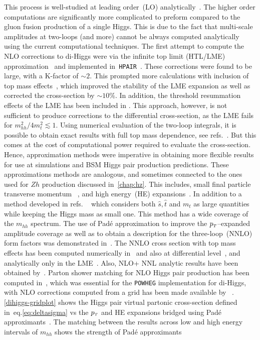 This process is well-studied at leading order~(LO) analytically~\cite{EBOLI1987269,GLOVER1988282,DICUS1988457,Plehn:1996wb}.  The higher order computations are significantly more complicated to preform compared to the gluon fusion production of a single Higgs. This is due to the fact that multi-scale amplitudes at two-loops (and more) cannot be always computed analytically using the current computational techniques.  The first attempt to compute the NLO corrections to di-Higgs were via the infinite top limit (HTL/LME)  approximation~\cite{Dawson:1998py, Altenkamp:2012sx,Grigo:2014jma} and implemented in~\texttt{HPAIR}~\cite{Plehn:1996wb}. These corrections were found to be large, with a K-factor of $ \sim 2$.  This prompted more calculations with inclusion of top mass effects~\cite{deFlorian:2013uza,Grigo:2013rya,Maltoni:2014eza,Grigo:2015dia,Degrassi:2016vss}, which improved the stability of the LME expansion as well as corrected the cross-section by $\sim 10\%$. In addition, the threshold resummation effects of the LME has been included in \cite{Shao:2013bz}. This approach, however, is not sufficient to produce corrections to the differential cross-section, as the LME fails for $m_{hh}^2/4m_t^2 \lesssim 1$. Using numerical evaluation of the two-loop integrals, it is possible to obtain exact results with full top mass dependence, see refs.~\cite{Borowka:2016ypz,Borowka:2016ehy,Baglio:2018lrj}. But this comes at the cost of computational power required to evaluate the cross-section.  Hence, approximation methods were imperative in obtaining more flexible results for use at simulations and BSM Higgs pair production predictions.  These approximations methods are analogous, and sometimes connected  to the ones used for $Zh$ production discussed in~\autoref{chap:hz}. This includes, small final particle transverse momentum ~\cite{Bonciani:2018omm}, and high energy~(HE) expansions~\cite{Davies:2018ood}. In addition to a method developed in refs. ~\cite{Xu:2018eos,Wang:2020nnr} which considers both $\hat s , \hat t$ and $m_t$ as large quantities while keeping the Higgs mass as small one. This method has a wide coverage of the $m_{hh}$ spectrum.  The use of Pad\'e approximation to improve the $p_{\scriptscriptstyle T}$--expanded amplitude coverage as well as to obtain a description for the three-loop~(NNLO) form factors was demonstrated in~\cite{Davies:2019nhm}. The NNLO cross section with top mass effects has been computed numerically in~\cite{Grazzini:2018bsd} and also at differential level~\cite{deFlorian:2016uhr}, and analytically only in the LME~\cite{deFlorian:2013jea}. Also, NLO+ NNL analytic results have been obtained by~\cite{deFlorian:2015moa}. Parton shower matching for NLO Higgs pair production has been computed  in~\cite{Jones:2017giv,Heinrich:2019bkc}, which was essential for the \texttt{POWHEG} implementation for di-Higgs, with NLO corrections computed from a grid has been made available by ~\cite{Heinrich:2017kxx,Heinrich:2019bkc,Heinrich:2020ckp}. \autoref{dihiggs-gridplot} shows the Higgs pair virtual partonic cross-section defined in~eq.\eqref{eq:deltasigma} vs the  $p_{\scriptscriptstyle T}$ and HE expansions bridged using Pad\'e  approximants~\cite{Bellafronte:2022jmo}.  The matching between the results across low and high energy intervals of $m_{hh}$ shows the strength of Pad\'e  approximants 